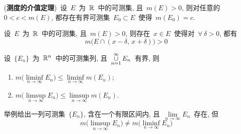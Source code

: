 \begin{problemset}
\item (\textbf{测度的介值定理})\ 设~$E$~为~$\mathbb{R}$~中的可测集, 且~$m(E) > 0$, 则对任意的~$0 < c < m(E)$, 都存在有界可测集~$E_0 \subset E$~使得~$m(E_0)=c$.

\item 设~$E$~为~$\mathbb{R}$~中的可测集, 且~$m(E) > 0$, 则存在~$x \in E$~使得对~$\forall~\delta >0$, 都有
\[
m\big( E \cap (x-\delta,\,x+\delta) \big) > 0
\]

\item 设~$\{E_n\}$~为~$\mathbb{R}^n$~中的可测集列, 且~$\mathop{\cup}\limits_{n=1}^\infty E_n$~有界, 则
\begin{enumerate}
  \item $m\big( \liminf\limits_{n \to \infty} E_n \big) \leqslant \liminf\limits_{n \to \infty} m(E_n)$;
  \item $m\big( \limsup\limits_{n \to \infty} E_n \big) \leqslant \limsup\limits_{n \to \infty} m(E_n)$.
\end{enumerate}

\item 举例给出一列可测集~$\{E_n\}$, 含在一个有限区间内, 且~$\lim\limits_{n \to \infty} E_n$~存在, 但
\[
m\big( \limsup_{n \to \infty} E_n \big) \neq m\big( \liminf_{n \to \infty} E_n \big)
\]
\end{problemset}

